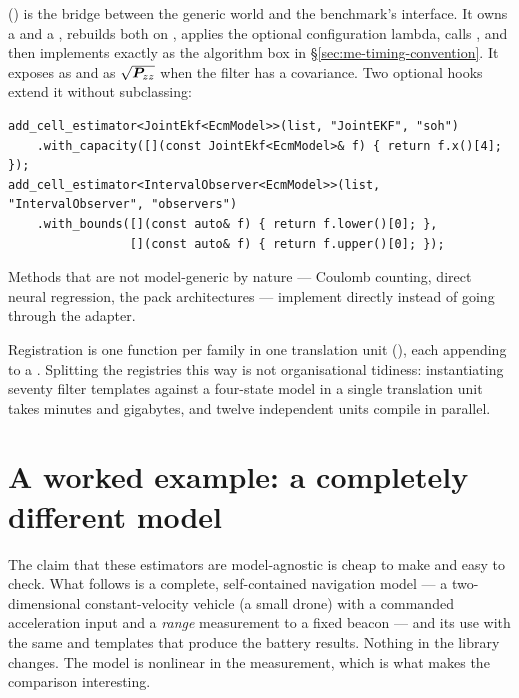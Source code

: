  () is the bridge between the
generic world and the benchmark's  interface. It owns a  and a
, rebuilds both on , applies the optional configuration lambda, calls
, and then implements  exactly as the algorithm
box in \S\ref{sec:me-timing-convention}. It exposes  as  and
 as $\sqrt{\bm{P}_{zz}}$ when the filter has a covariance. Two optional hooks
extend it without subclassing:
\begin{lstlisting}
add_cell_estimator<JointEkf<EcmModel>>(list, "JointEKF", "soh")
    .with_capacity([](const JointEkf<EcmModel>& f) { return f.x()[4]; });
add_cell_estimator<IntervalObserver<EcmModel>>(list, "IntervalObserver", "observers")
    .with_bounds([](const auto& f) { return f.lower()[0]; },
                 [](const auto& f) { return f.upper()[0]; });
\end{lstlisting}
Methods that are not model-generic by nature --- Coulomb counting, direct neural regression, the
pack architectures --- implement  directly instead of going through the
adapter.

Registration is one function per family in one translation unit
(), each appending to a .
Splitting the registries this way is not organisational tidiness: instantiating seventy filter
templates against a four-state model in a single translation unit takes minutes and gigabytes, and
twelve independent units compile in parallel.

\section{A worked example: a completely different model}
\label{sec:lib-example}

The claim that these estimators are model-agnostic is cheap to make and easy to check. What
follows is a complete, self-contained navigation model --- a two-dimensional constant-velocity
vehicle (a small drone) with a commanded acceleration input and a \emph{range} measurement to a
fixed beacon --- and its use with the same  and  templates that produce the
battery results. Nothing in the library changes. The model is nonlinear in the measurement, which
is what makes the comparison interesting.

